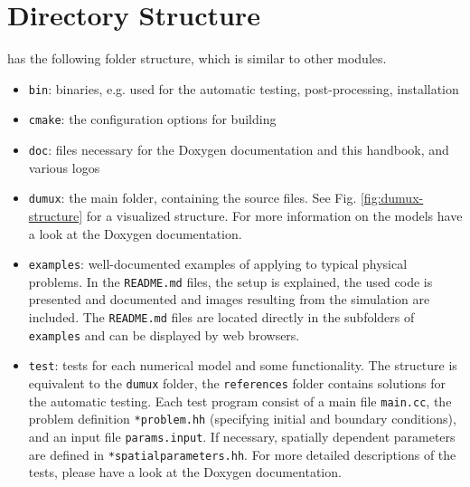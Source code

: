 \section{Directory Structure}
\label{sc_structure}

\Dumux has the following folder structure, which is similar to other \Dune modules.
\begin{itemize}
\item \texttt{bin}: binaries, e.g. used for the automatic testing, post-processing, installation
\item \texttt{cmake}: the configuration options for building \Dumux
\item \texttt{doc}: files necessary for the Doxygen documentation and this handbook, and various logos
\item \texttt{dumux}: the main folder, containing the source files. See Fig. \ref{fig:dumux-structure}
      for a visualized structure. For more information on the models have a look at the
      Doxygen documentation.
\item \texttt{examples}: well-documented examples of applying \Dumux to typical physical problems. In the \texttt{README.md} files, the setup is explained, the used code is presented and documented and images resulting from the simulation are included. The \texttt{README.md} files are located directly in the subfolders of \texttt{examples} and can be displayed by web browsers.
\item \texttt{test}: tests for each numerical model and some functionality.
      The structure is equivalent to the \texttt{dumux} folder, the \texttt{references} folder
      contains solutions for the automatic testing. Each test program consist of a main file
      \texttt{main.cc}, the problem definition \texttt{*problem.hh} (specifying initial and boundary
      conditions), and an input file \texttt{params.input}.
      If necessary, spatially dependent parameters are defined in \texttt{*spatialparameters.hh}.
      For more detailed descriptions of the tests, please have a look at the Doxygen documentation.
\end{itemize}

